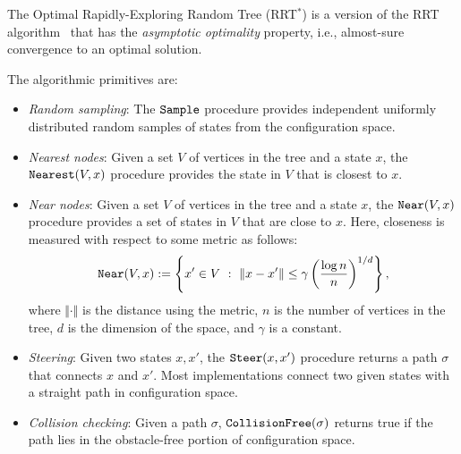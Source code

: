 The Optimal Rapidly-Exploring Random Tree (RRT$^*$) \cite{karaman.frazzoli.ijrr11} is a version of the RRT algorithm~\cite{lavalle.kuffner.ijrr01} that has the \emph{asymptotic optimality} property, i.e., almost-sure convergence to an optimal solution.

The algorithmic primitives are:
\begin{itemize}
\item {\it Random sampling}:
%
The ${\tt Sample}$ procedure provides independent uniformly distributed random samples of states from the configuration space.

\item {\it Nearest nodes}:
%
Given a set $V$ of vertices in the tree and a state $x$, the ${\tt
Nearest}(V, x)$ procedure provides the state in $V$ that is closest to
$x$. 

\item {\it Near nodes}:
%
Given a set $V$ of vertices in the tree and a state $x$, the ${\tt
Near}(V, x)$ procedure provides a set of states in $V$ that are close to
$x$. Here, closeness is measured with respect to some metric as
follows:
$$
{\tt Near}(V, x) := \left\{ x' \in V \,\,:\,\, \Vert x - x' \Vert \le \gamma
\left(\frac{\log n}{n}\right)^{1/d} \right\},
$$
where $\Vert \cdot \Vert$ is the distance using the metric, $n$ is the number of vertices in the tree, $d$ is the dimension of the space, and $\gamma$ is a constant.
 

\item {\it Steering}:
%
Given two states $x, x'$, the ${\tt Steer}(x,x')$ procedure returns a path $\sigma$ that connects $x$ and $x'$. Most implementations connect two given states with a straight path in configuration space.

\item {\it Collision checking}:
%
Given a path $\sigma$, ${\tt CollisionFree}(\sigma)$ returns true if the path lies in the obstacle-free portion of configuration space.

\end{itemize}

